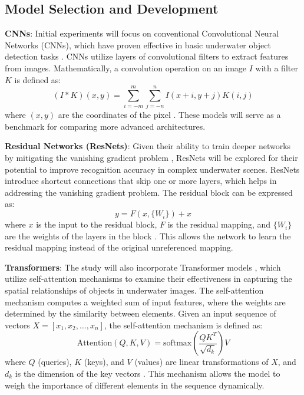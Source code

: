 \subsection{Model Selection and Development}

\begin{APAitemize}
    \item \textbf{CNNs}: Initial experiments will focus on conventional
     Convolutional Neural Networks (CNNs), which have proven effective in basic underwater object
     detection tasks \parencite{hanUnderwaterImageProcessing2020}. 
     CNNs utilize layers of convolutional filters to extract features from images. 
     Mathematically, a convolution operation on an image \( I \) with a filter \( K \) 
     is defined as:
     \begin{equation}
     (I * K)(x,y) = \sum_{i=-m}^{m} \sum_{j=-n}^{n} I(x+i, y+j) K(i, j)
     \end{equation}
     where \( (x, y) \) are the coordinates of the pixel \parencite{dumoulinGuideConvolutionArithmetic2018}.
     These models will serve as a benchmark for comparing more advanced architectures.

    \item \textbf{Residual Networks (ResNets)}: Given their ability to train
     deeper networks by mitigating the vanishing gradient problem \parencite{heDeepResidualLearning2016},
     ResNets will be explored for their potential to improve recognition accuracy in complex underwater scenes.
     ResNets introduce shortcut connections that skip one or more layers, which helps in addressing the vanishing gradient problem. 
     The residual block can be expressed as:
     \begin{equation}
     y = F(x, \{W_i\}) + x
     \end{equation}
     where \( x \) is the input to the residual block, \( F \) is the residual mapping, and \( \{W_i\} \) are the weights of the layers in the block \parencite{heDeepResidualLearning2016}. This allows the network to learn the residual mapping instead of the original unreferenced mapping.

     \item \textbf{Transformers}: The study will also incorporate Transformer
     models \parencite{hanSurveyVisionTransformer2023}, which utilize self-attention mechanisms to examine their
     effectiveness in capturing the spatial relationships of objects in underwater images.
     The self-attention mechanism computes a weighted sum of input features, where the weights are determined by the similarity between elements.
     Given an input sequence of vectors \( X = [x_1, x_2, \ldots, x_n] \), the self-attention mechanism is defined as:
     \begin{equation}
     \text{Attention}(Q, K, V) = \text{softmax}\left(\frac{QK^T}{\sqrt{d_k}}\right)V
     \end{equation}
     where \( Q \) (queries), \( K \) (keys), and \( V \) (values) are linear transformations of \( X \), and \( d_k \) is the dimension of the key vectors \parencite{vaswaniAttentionAllYou2023}. This mechanism allows the model to weigh the importance of different elements in the sequence dynamically.
\end{APAitemize}

